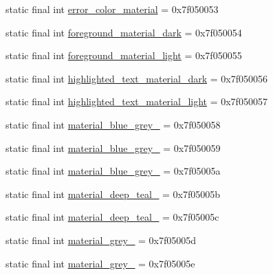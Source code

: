 \begin{DoxyCompactItemize}
\item 
static final int \mbox{\hyperlink{classandroid_1_1support_1_1v7_1_1appcompat_1_1R_1_1color_acda7a2036b7587d6f96eca93fed96ef3}{error\+\_\+color\+\_\+material}} = 0x7f050053
\item 
static final int \mbox{\hyperlink{classandroid_1_1support_1_1v7_1_1appcompat_1_1R_1_1color_a0e92ea4a646c7265ffc07bb24b37a159}{foreground\+\_\+material\+\_\+dark}} = 0x7f050054
\item 
static final int \mbox{\hyperlink{classandroid_1_1support_1_1v7_1_1appcompat_1_1R_1_1color_aac4940e503b096bce527e09a156fd673}{foreground\+\_\+material\+\_\+light}} = 0x7f050055
\item 
static final int \mbox{\hyperlink{classandroid_1_1support_1_1v7_1_1appcompat_1_1R_1_1color_a353827fd67f511ffa13b0841163a5e59}{highlighted\+\_\+text\+\_\+material\+\_\+dark}} = 0x7f050056
\item 
static final int \mbox{\hyperlink{classandroid_1_1support_1_1v7_1_1appcompat_1_1R_1_1color_af83110813f0593731629ede40790138c}{highlighted\+\_\+text\+\_\+material\+\_\+light}} = 0x7f050057
\item 
static final int \mbox{\hyperlink{classandroid_1_1support_1_1v7_1_1appcompat_1_1R_1_1color_a7b17af0188db9a6eeddba08a52c2b81e}{material\+\_\+blue\+\_\+grey\+\_}} = 0x7f050058
\item 
static final int \mbox{\hyperlink{classandroid_1_1support_1_1v7_1_1appcompat_1_1R_1_1color_a94196ea3a71d1fb078c4cfe7fead05ed}{material\+\_\+blue\+\_\+grey\+\_}} = 0x7f050059
\item 
static final int \mbox{\hyperlink{classandroid_1_1support_1_1v7_1_1appcompat_1_1R_1_1color_aac3b5a45f073f66668c2786bc024b871}{material\+\_\+blue\+\_\+grey\+\_}} = 0x7f05005a
\item 
static final int \mbox{\hyperlink{classandroid_1_1support_1_1v7_1_1appcompat_1_1R_1_1color_a9fa713d57229e83e5e8a81ae660895e9}{material\+\_\+deep\+\_\+teal\+\_}} = 0x7f05005b
\item 
static final int \mbox{\hyperlink{classandroid_1_1support_1_1v7_1_1appcompat_1_1R_1_1color_a91e168c89674f059c16a0bf87e6c0721}{material\+\_\+deep\+\_\+teal\+\_}} = 0x7f05005c
\item 
static final int \mbox{\hyperlink{classandroid_1_1support_1_1v7_1_1appcompat_1_1R_1_1color_ada094c4cdef10ed8b563632bbc13a2e8}{material\+\_\+grey\+\_}} = 0x7f05005d
\item 
static final int \mbox{\hyperlink{classandroid_1_1support_1_1v7_1_1appcompat_1_1R_1_1color_a6b86e97d87330195a77f48657aa3753d}{material\+\_\+grey\+\_}} = 0x7f05005e

\end{DoxyCompactItemize}
